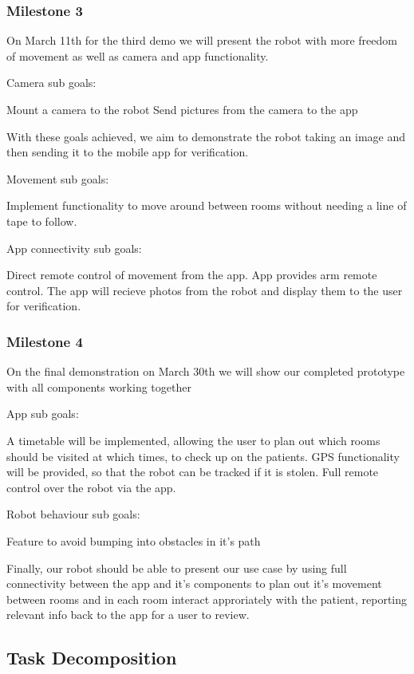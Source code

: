 \documentclass{article}
\begin{document}
\subsubsection{Milestone 3}

On March 11th for the third demo we will present the robot with more freedom of movement as well as camera and app functionality.

Camera sub goals:

Mount a camera to the robot
Send pictures from the camera to the app

With these goals achieved, we aim to demonstrate the robot taking an image and then sending it to the mobile app for verification.

Movement sub goals:

Implement functionality to move around between rooms without needing a line of tape to follow.

App connectivity sub goals:

Direct remote control of movement from the app.
App provides arm remote control.
The app will recieve photos from the robot and display them to the user for verification.


\subsubsection{Milestone 4}

On the final demonstration on March 30th we will show our completed prototype with all components working together

App sub goals:

A timetable will be implemented, allowing the user to plan out which rooms should be visited at which times, to check up on the patients.
GPS functionality will be provided, so that the robot can be tracked if it is stolen.
Full remote control over the robot via the app.

Robot behaviour sub goals:

Feature to avoid bumping into obstacles in it's path

Finally, our robot should be able to present our use case by using full connectivity between the app and it's components to plan out it's movement between rooms and in each room interact approriately with the patient, reporting relevant info back to the app for a user to review.


\subsection{Task Decomposition}
\end{document}
